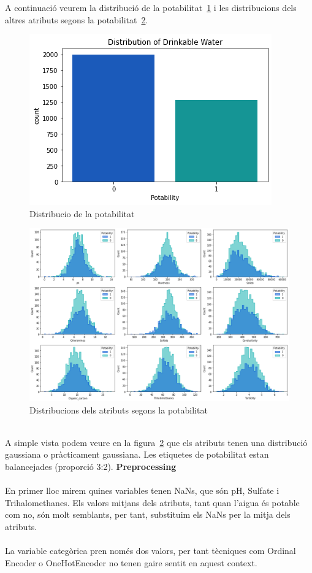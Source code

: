 \documentclass{article}
\begin{document}
	A continuació veurem la distribució de la potabilitat~\ref{fig:distribuciopotabilitat} i les distribucions dels altres atributs segons la potabilitat~\ref{fig:distribucions}.\\
	\begin{figure}[!h]
		\centering
		\includegraphics[width=0.4\linewidth]{../images/distribucio_potabilitat}
		\caption{Distribucio de la potabilitat}
		\label{fig:distribuciopotabilitat}
	\end{figure}
	\begin{figure}[!h]
		\centering
		\includegraphics[width=0.7\linewidth]{../images/distribucions}
		\caption{Distribucions dels atributs segons la potabilitat}
		\label{fig:distribucions}
	\end{figure}\\
	A simple vista podem veure en la figura~\ref{fig:distribucions} que els atributs tenen una distribució gaussiana o pràcticament gaussiana. Les etiquetes de potabilitat estan balancejades (proporció 3:2).
	\clearpage
	\noindent
	\textbf{Preprocessing}\\
	\\
	En primer lloc mirem quines variables tenen NaNs, que són pH, Sulfate i Trihalomethanes. Els valors mitjans dels atributs, tant quan l'aigua és potable com no, són molt semblants, per tant, substituim els NaNs per la mitja dels atributs.\\
	\\
	La variable categòrica pren només dos valors, per tant tècniques com Ordinal Encoder o OneHotEncoder no tenen gaire sentit en aquest context.\\
\end{document}
